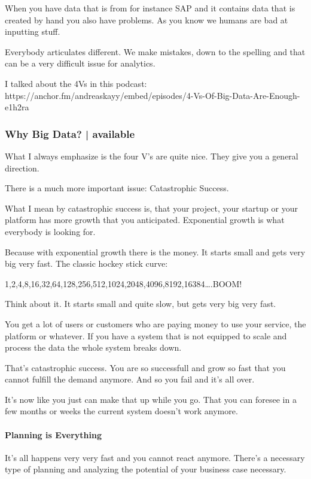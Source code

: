 \documentclass[12pt]{scrartcl} %
\begin{document}
When you have data that is from for instance SAP and it contains data that is created by hand you also have problems. As you know we humans are bad at inputting stuff.

Everybody articulates different. We make mistakes, down to the spelling and that can be a very difficult issue for analytics.


I talked about the 4Vs in this podcast: https://anchor.fm/andreaskayy/embed/episodes/4-Vs-Of-Big-Data-Are-Enough-e1h2ra

\subsubsection{Why Big Data? | available}

What I always emphasize is the four V’s are quite nice. They give you a general direction.

There is a much more important issue: Catastrophic Success.

What I mean by catastrophic success is, that your project, your startup or your platform has more growth that you anticipated. Exponential growth is what everybody is looking for.

Because with exponential growth there is the money. It starts small and gets very big very fast. The classic hockey stick curve:

1,2,4,8,16,32,64,128,256,512,1024,2048,4096,8192,16384….BOOM!

Think about it. It starts small and quite slow, but gets very big very fast.

You get a lot of users or customers who are paying money to use your service, the platform or whatever. If you have a system that is not equipped to scale and process the data the whole system breaks down.

That’s catastrophic success. You are so successfull and grow so fast that you cannot fulfill the demand anymore. And so you fail and it’s all over.

It’s now like you just can make that up while you go. That you can foresee in a few months or weeks the current system doesn’t work anymore.

\paragraph{Planning is Everything}

It’s all happens very very fast and you cannot react anymore. There’s a necessary type of planning and analyzing the potential of your business case necessary.
\end{document}
